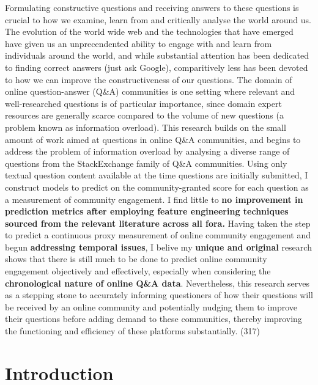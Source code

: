 \documentclass[11pt,preprint, authoryear]{article}
\numberwithin{equation}{section}
\begin{document}
Formulating constructive questions and receiving answers to these
questions is crucial to how we examine, learn from and critically
analyse the world around us. The evolution of the world wide web and the
technologies that have emerged have given us an unprecendented ability
to engage with and learn from individuals around the world, and while
substantial attention has been dedicated to finding correct answers
(just ask Google), comparitively less has been devoted to how we can
improve the constructiveness of our questions. The domain of online
question-answer (Q\&A) communities is one setting where relevant and
well-researched questions is of particular importance, since domain
expert resources are generally scarce compared to the volume of new
questions (a problem known as information overload). This research
builds on the small amount of work aimed at questions in online Q\&A
communities, and begins to address the problem of information overload
by analysing a diverse range of questions from the StackExchange family
of Q\&A communities. Using only textual question content available at
the time questions are initially submitted, I construct models to
predict on the community-granted score for each question as a
measurement of community engagement. I find little to \textbf{no
improvement in prediction metrics after employing feature engineering
techniques sourced from the relevant literature across all fora.} Having
taken the step to predict a continuous proxy measurement of online
community engagement and begun \textbf{addressing temporal issues}, I
belive my \textbf{unique and original} research shows that there is
still much to be done to predict online community engagement objectively
and effectively, especially when considering the \textbf{chronological
nature of online Q\&A data}. Nevertheless, this research serves as a
stepping stone to accurately informing questioners of how their
questions will be received by an online community and potentially
nudging them to improve their questions before adding demand to these
communities, thereby improving the functioning and efficiency of these
platforms substantially. (317)

\clearpage


\newpage

\section{\texorpdfstring{Introduction
\label{Intro}}{Introduction }}\label{introduction}
\end{document}
